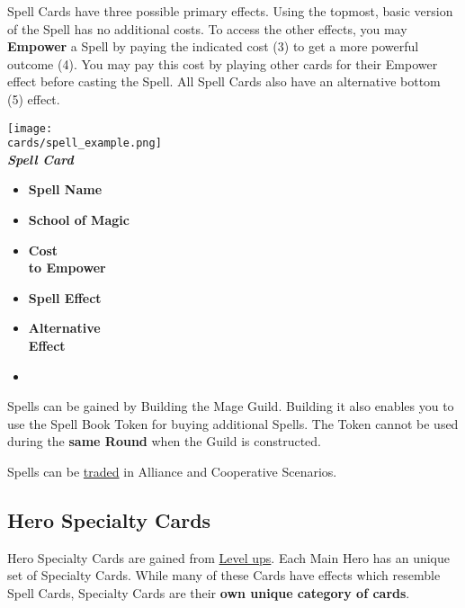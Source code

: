 \begin{multicols*}{2}
Spell Cards have three possible primary effects.
Using the topmost, basic version of the Spell has no additional costs.
To access the other effects, you may \textbf{Empower} a Spell by paying the indicated cost (3) to get a more powerful outcome (4).
You may pay this cost by playing other cards for their Empower  effect before casting the Spell.
All Spell Cards also have an alternative bottom (5)  effect.\par


{
  \centering
  \texttt{[image: \\cards/spell\_example.png]}\\
  \medskip
  \footnotesize{\textbf{\textit{\textcolor{darkcandyapplered}{Spell Card}}}}
  \scriptsize
  \begin{multicols}{2}
    \begin{itemize}[itemsep=5pt]
      \item[\textbf{1.}] \textbf{Spell Name}
      \item[\textbf{2.}] \textbf{School of Magic}
      \item[\textbf{3.}] \textbf{Cost\\to Empower}
      \item[\textbf{4.}] \textbf{Spell Effect}
      \item[\textbf{5.}] \textbf{Alternative\\Effect}
      \item[]
    \end{itemize}
  \end{multicols}
}

Spells can be gained by Building the Mage Guild.
Building it also enables you to use the Spell Book Token for buying additional Spells.
The Token cannot be used during the \textbf{same Round} when the Guild is constructed.\par
Spells can be \hyperlink{Trading}{traded} in Alliance and Cooperative Scenarios.

\subsection*{\hypertarget{Specialty}{Hero Specialty Cards}}

Hero Specialty Cards are gained from \hyperlink{Level}{Level ups}.
Each Main Hero has an unique set of Specialty Cards.
While many of these Cards have effects which resemble Spell Cards, Specialty Cards are their \textbf{own unique category of cards}.


\end{multicols*}
